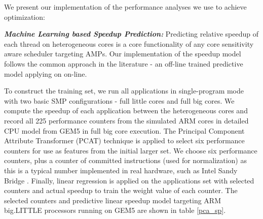 \documentclass{sig-alternate}
\begin{document}
We present our implementation of the performance analyses we use to achieve optimization:

\textbf{\textit{Machine Learning based Speedup Prediction:}} Predicting relative speedup of each thread on heterogeneous cores is a core functionality of any core sensitivity aware scheduler targeting AMPs. Our implementation of the speedup model follows the common approach in the literature \cite{van2013fairness,jibaja2016portable,saez2012leveraging}- an off-line trained predictive model applying on on-line. 

To construct the training set, we run all applications in single-program mode with two basic SMP configurations - full little cores and full big cores. We compute the speedup of each application between the heterogeneous cores and record all 225 performance counters from the simulated ARM cores in detailed CPU model from GEM5 \cite{binkert2011gem5} in full big core execution. The Principal Component Attribute Transformer (PCAT) technique \cite{witten2016data} is applied to select six performance counters for use as features from the initial larger set. We choose six performance counters, plus a counter of committed instructions (used for normalization) as this is a typical number implemented in real hardware, such as Intel Sandy Bridge \cite{jibaja2016portable}. Finally, linear regression is applied on the applications set with selected counters and actual speedup to train the weight value of each counter. The selected counters and predictive linear speedup model targeting ARM big.LITTLE processors running on GEM5 are shown in table \ref{pca_sp}.  
\end{document}

